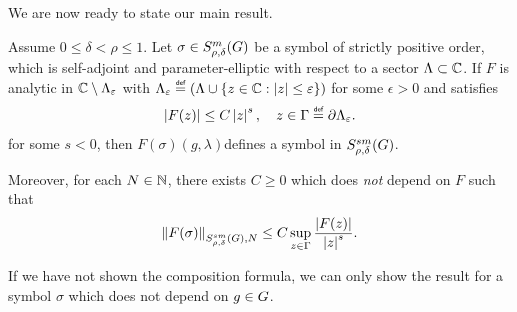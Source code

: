 We are now ready to state our main result.
\begin{theorem}
\label{theorem:functional_calculus}
    Assume $0 \leq \delta < \rho \leq 1$.
    Let $\sigma \in S^{m}_{\rho, \delta}(G)$ be a symbol of strictly positive order,
    which is self-adjoint and parameter-elliptic with respect to a sector $\Lambda \subset \mathbb{C}$.
    If $F$ is analytic in $\mathbb{C} \setminus \Lambda_\varepsilon$
    with $\Lambda_\epsilon \defeq (\Lambda \cup \{z \in \C : \abs z \leq \epsilon\})$ for some $\epsilon > 0$
    and satisfies
    \begin{align*}
        \abs {F(z)} \leq C \abs z^s, \quad z \in \Gamma \defeq \partial \Lambda_\epsilon.
    \end{align*}
    for some $s < 0$,
    then $F(\sigma)(g, \lambda) $defines a symbol in $S^{s m}_{\rho, \delta}(G)$.

    Moreover,
    for each $N \in \mathbb{N}$,
    there exists $C \geq 0$ which does \emph{not} depend on $F$ such that
    \begin{align}
        \SymbolSemiNorm {s m} {\rho, \delta} N {F(\sigma)} \leq C \sup_{z \in \Gamma} \frac {\abs {F(z)}} {\abs z^s}.
        \label{eq:functional_calculus:bound_on_seminorm}
    \end{align}

    If we have not shown the composition formula,
    we can only show the result for a symbol $\sigma$ which does not depend on $g \in G$.
\end{theorem}
